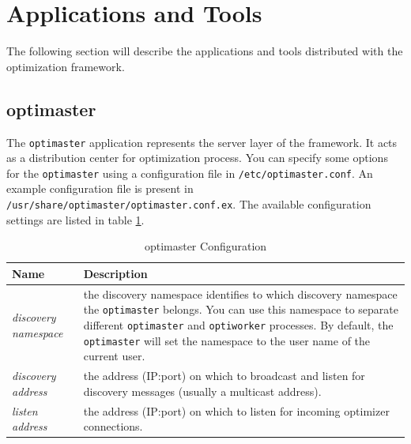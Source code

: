 \documentclass{article}
\begin{document}
\section{Applications and Tools}
The following section will describe the applications and tools distributed with
the optimization framework.

\subsection{optimaster}\label{app:optimaster}
The \verb!optimaster! application represents the server layer of the framework. It
acts as a distribution center for optimization process. You can specify some
options for the \verb!optimaster! using a configuration file in \verb!/etc/optimaster.conf!.
An example configuration file is present in
\verb!/usr/share/optimaster/optimaster.conf.ex!. The available configuration
settings are listed in table \ref{tab:optimaster_configuration}.

\begin{table}[h!tb]\caption{optimaster Configuration}\label{tab:optimaster_configuration}\vspace{0.1in}
	\centering

	\begin{tabular}{p{4cm} p{10cm}}
		\toprule
		\textbf{Name} & \textbf{Description} \\
		\midrule
		\textit{discovery namespace} & the discovery namespace identifies
		                               to which discovery namespace the
		                               \verb!optimaster! belongs. You can use this
		                               namespace to separate different
		                               \verb!optimaster! and \verb!optiworker! processes.
		                               By default, the \verb!optimaster! will set
		                               the namespace to the user name of the
		                               current user. \\
		\textit{discovery address} & the address (IP:port) on which to
		                             broadcast and listen for discovery
		                             messages (usually a multicast address). \\
		\textit{listen address} & the address (IP:port) on which to
		                          listen for incoming optimizer connections. \\
		\bottomrule
	\end{tabular}
\end{table}
\end{document}
